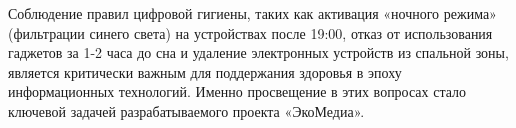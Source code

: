 Соблюдение правил цифровой гигиены, таких как активация «ночного режима» (фильтрации синего света) на устройствах после 19:00, отказ от использования гаджетов за 1-2 часа до сна и удаление электронных устройств из спальной зоны, является критически важным для поддержания здоровья в эпоху информационных технологий. Именно просвещение в этих вопросах стало ключевой задачей разрабатываемого проекта «ЭкоМедиа».
